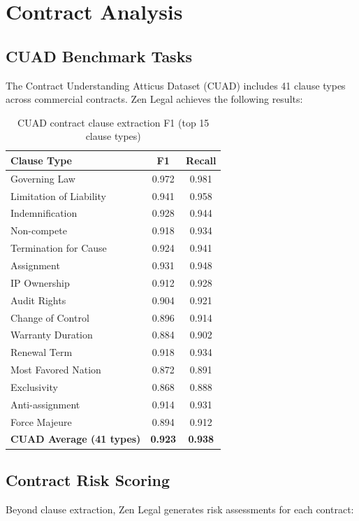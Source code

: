 \documentclass[11pt,a4paper]{article}
\begin{document}
\section{Contract Analysis}

\subsection{CUAD Benchmark Tasks}

The Contract Understanding Atticus Dataset (CUAD) includes 41 clause types across commercial contracts. Zen Legal achieves the following results:

\begin{table}[H]
\centering
\caption{CUAD contract clause extraction F1 (top 15 clause types)}
\label{tab:cuad}
\begin{tabular}{lcc}
\toprule
Clause Type & F1 & Recall \\
\midrule
Governing Law & 0.972 & 0.981 \\
Limitation of Liability & 0.941 & 0.958 \\
Indemnification & 0.928 & 0.944 \\
Non-compete & 0.918 & 0.934 \\
Termination for Cause & 0.924 & 0.941 \\
Assignment & 0.931 & 0.948 \\
IP Ownership & 0.912 & 0.928 \\
Audit Rights & 0.904 & 0.921 \\
Change of Control & 0.896 & 0.914 \\
Warranty Duration & 0.884 & 0.902 \\
Renewal Term & 0.918 & 0.934 \\
Most Favored Nation & 0.872 & 0.891 \\
Exclusivity & 0.868 & 0.888 \\
Anti-assignment & 0.914 & 0.931 \\
Force Majeure & 0.894 & 0.912 \\
\midrule
\textbf{CUAD Average (41 types)} & \textbf{0.923} & \textbf{0.938} \\
\bottomrule
\end{tabular}
\end{table}

\subsection{Contract Risk Scoring}

Beyond clause extraction, Zen Legal generates risk assessments for each contract:
\end{document}

